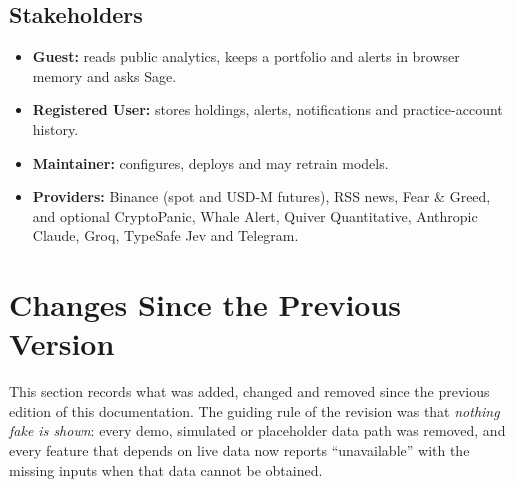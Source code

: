\subsection{Stakeholders}
\begin{itemize}
\item \textbf{Guest:} reads public analytics, keeps a portfolio and alerts in browser memory and asks Sage.
\item \textbf{Registered User:} stores holdings, alerts, notifications and practice-account history.
\item \textbf{Maintainer:} configures, deploys and may retrain models.
\item \textbf{Providers:} Binance (spot and USD-M futures), RSS news, Fear \& Greed, and optional CryptoPanic, Whale Alert, Quiver Quantitative, Anthropic Claude, Groq, TypeSafe Jev and Telegram.
\end{itemize}

\section{Changes Since the Previous Version}\label{sec:changes}
This section records what was added, changed and removed since the previous edition of this documentation. The guiding rule of the revision was that \textit{nothing fake is shown}: every demo, simulated or placeholder data path was removed, and every feature that depends on live data now reports ``unavailable'' with the missing inputs when that data cannot be obtained.

